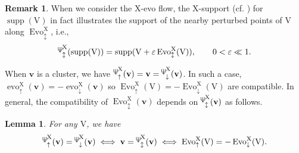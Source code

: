 \documentclass[11pt,reqno]{amsart}
\newcommand{\Neptune}{\mathord{\text{\tikz[baseline=-.5ex,scale=.13]{\draw[line width=.45pt] (0,0)--(0,1.8) (-.6,1.8)--(-.6,.8)--(.6,.8)--(.6,1.8) (-.35,.35)--(.35,.35);}}}}
\theoremstyle{plain}
\newtheorem{lemma}[theorem]{Lemma}
\theoremstyle{definition}
\newtheorem{remark}[theorem]{Remark}
\numberwithin{equation}{section}
\newcommand\<{\langle}
\renewcommand\>{\rangle}
\newcommand{\on}[1]{\operatorname{#1}}
\def\vv{\mathbf{v}}
\def\sink{X}
\newcommand{\flowd}[1]{\on{evo}^{#1}_{\downarrow}}
\newcommand{\flowu}[1]{\on{evo}^{#1}_{\uparrow}}
\newcommand{\flowD}[1]{\on{Evo}_{\downarrow}^{#1}}
\newcommand{\flowU}[1]{\on{Evo}_{\uparrow}^{#1}}
\newcommand{\flowDU}[1]{\on{Evo}_{\updownarrow}^{#1}}
\newcommand{\ccpt}[1]{\mathrm{#1}}%
\def\xevo{\ccpt{X}}%
\def\supp{\on{supp}}
\newcommand{\suppd}[1]{\operatorname{\Neptune}_{\downarrow}^{#1}}
\newcommand{\suppu}[1]{\operatorname{\Neptune}_{\uparrow}^{#1}}
\newcommand{\suppdu}[1]{\operatorname{\Neptune}_{\updownarrow}^{#1}}
\begin{document}
\begin{remark}\label{rem:Xsupp}
When we consider the $\xevo$-evo flow, the $\xevo$-support (cf. ) for $\supp(\ccpt{V})$ in fact illustrates the support of the nearby perturbed points of $\ccpt{V}$ along $\flowDU{\xevo}$, i.e.,
\begin{gather}\label{eq:suppEvo}
\suppdu{\xevo}(\supp(\ccpt{V}))=\supp(\ccpt{V}+\varepsilon\flowDU{\xevo}(\ccpt{V})),
\qquad     0<\varepsilon\ll1.
\end{gather}
\end{remark}

When $\vv$ is a cluster, we have $\suppu{\xevo}(\vv)=\vv=\suppd{\xevo}(\vv)$.
In such a case, $\flowu{\xevo}(\vv)=-\flowd{\xevo}(\vv)$ so $\flowU{\xevo}(\ccpt{V})=-\flowD{\xevo}(\ccpt{V})$ are compatible.
In general, the compatibility of $\flowDU{\xevo}(\vv)$ depends on $\suppdu{\xevo}(\vv)$ as follows.

\begin{lemma}\label{lem:c-coincide}
For any $\ccpt{V}$, we have
\begin{gather}\label{eq:c-coincide}
    \suppu{\xevo}(\vv)=\suppd{\xevo}(\vv)\iff
    \vv=\suppdu{\xevo}(\vv)\iff
    \flowU{\xevo}(\ccpt{V})=-\flowD{\xevo}(\ccpt{V}).
\end{gather}
\end{lemma}
\end{document}
